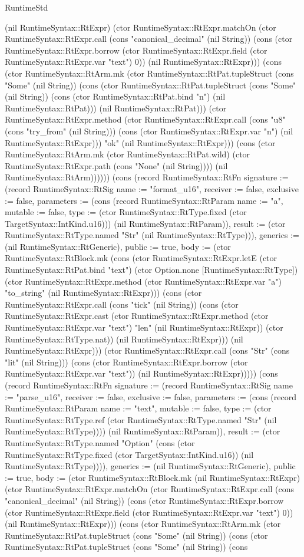 \begin{lexlean}{RuntimeStd}
\begin{semanticmodule}
{(nil RuntimeSyntax::RtExpr) (ctor RuntimeSyntax::RtExpr.matchOn (ctor RuntimeSyntax::RtExpr.call (cons "canonical_decimal" (nil String)) (cons (ctor RuntimeSyntax::RtExpr.borrow (ctor RuntimeSyntax::RtExpr.field (ctor RuntimeSyntax::RtExpr.var "text") 0)) (nil RuntimeSyntax::RtExpr))) (cons (ctor RuntimeSyntax::RtArm.mk (ctor RuntimeSyntax::RtPat.tupleStruct (cons "Some" (nil String)) (cons (ctor RuntimeSyntax::RtPat.tupleStruct (cons "Some" (nil String)) (cons (ctor RuntimeSyntax::RtPat.bind "n") (nil RuntimeSyntax::RtPat))) (nil RuntimeSyntax::RtPat))) (ctor RuntimeSyntax::RtExpr.method (ctor RuntimeSyntax::RtExpr.call (cons "u8" (cons "try_from" (nil String))) (cons (ctor RuntimeSyntax::RtExpr.var "n") (nil RuntimeSyntax::RtExpr))) "ok" (nil RuntimeSyntax::RtExpr))) (cons (ctor RuntimeSyntax::RtArm.mk (ctor RuntimeSyntax::RtPat.wild) (ctor RuntimeSyntax::RtExpr.path (cons "None" (nil String)))) (nil RuntimeSyntax::RtArm)))))}) (cons (record RuntimeSyntax::RtFn {signature := (record RuntimeSyntax::RtSig {name := "format_u16", receiver := false, exclusive := false, parameters := (cons (record RuntimeSyntax::RtParam {name := "a", mutable := false, type := (ctor RuntimeSyntax::RtType.fixed (ctor TargetSyntax::IntKind.u16))}) (nil RuntimeSyntax::RtParam)), result := (ctor RuntimeSyntax::RtType.named "Str" (nil RuntimeSyntax::RtType))}), generics := (nil RuntimeSyntax::RtGeneric), public := true, body := (ctor RuntimeSyntax::RtBlock.mk (cons (ctor RuntimeSyntax::RtExpr.letE (ctor RuntimeSyntax::RtPat.bind "text") (ctor Option.none [RuntimeSyntax::RtType]) (ctor RuntimeSyntax::RtExpr.method (ctor RuntimeSyntax::RtExpr.var "a") "to_string" (nil RuntimeSyntax::RtExpr))) (cons (ctor RuntimeSyntax::RtExpr.call (cons "tick" (nil String)) (cons (ctor RuntimeSyntax::RtExpr.cast (ctor RuntimeSyntax::RtExpr.method (ctor RuntimeSyntax::RtExpr.var "text") "len" (nil RuntimeSyntax::RtExpr)) (ctor RuntimeSyntax::RtType.nat)) (nil RuntimeSyntax::RtExpr))) (nil RuntimeSyntax::RtExpr))) (ctor RuntimeSyntax::RtExpr.call (cons "Str" (cons "lit" (nil String))) (cons (ctor RuntimeSyntax::RtExpr.borrow (ctor RuntimeSyntax::RtExpr.var "text")) (nil RuntimeSyntax::RtExpr))))}) (cons (record RuntimeSyntax::RtFn {signature := (record RuntimeSyntax::RtSig {name := "parse_u16", receiver := false, exclusive := false, parameters := (cons (record RuntimeSyntax::RtParam {name := "text", mutable := false, type := (ctor RuntimeSyntax::RtType.ref (ctor RuntimeSyntax::RtType.named "Str" (nil RuntimeSyntax::RtType)))}) (nil RuntimeSyntax::RtParam)), result := (ctor RuntimeSyntax::RtType.named "Option" (cons (ctor RuntimeSyntax::RtType.fixed (ctor TargetSyntax::IntKind.u16)) (nil RuntimeSyntax::RtType)))}), generics := (nil RuntimeSyntax::RtGeneric), public := true, body := (ctor RuntimeSyntax::RtBlock.mk (nil RuntimeSyntax::RtExpr) (ctor RuntimeSyntax::RtExpr.matchOn (ctor RuntimeSyntax::RtExpr.call (cons "canonical_decimal" (nil String)) (cons (ctor RuntimeSyntax::RtExpr.borrow (ctor RuntimeSyntax::RtExpr.field (ctor RuntimeSyntax::RtExpr.var "text") 0)) (nil RuntimeSyntax::RtExpr))) (cons (ctor RuntimeSyntax::RtArm.mk (ctor RuntimeSyntax::RtPat.tupleStruct (cons "Some" (nil String)) (cons (ctor RuntimeSyntax::RtPat.tupleStruct (cons "Some" (nil String)) (cons }
\end{semanticmodule}
\end{lexlean}
